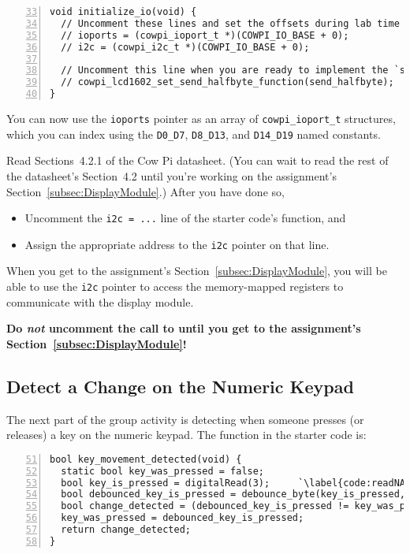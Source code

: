 \begin{lstlisting}[numberstyle=\color{gray}, numbers=left, firstnumber=33]
void initialize_io(void) {
  // Uncomment these lines and set the offsets during lab time
  // ioports = (cowpi_ioport_t *)(COWPI_IO_BASE + 0);
  // i2c = (cowpi_i2c_t *)(COWPI_IO_BASE + 0);

  // Uncomment this line when you are ready to implement the `send_halfbyte()` function
  // cowpi_lcd1602_set_send_halfbyte_function(send_halfbyte);
}
\end{lstlisting}

You can now use the \lstinline{ioports} pointer as an array of \lstinline{cowpi_ioport_t} structures, which you can index using the \lstinline{D0_D7}, \lstinline{D8_D13}, and \lstinline{D14_D19} named constants.

Read Sections~4.2.1 of the Cow Pi datasheet.
(You can wait to read the rest of the datasheet's Section~4.2 until you're working on the assignment's Section~\ref{subsec:DisplayModule}.)
After you have done so,
\begin{itemize}
    \item Uncomment the \lstinline{i2c = ...} line of the starter code's  function, and
    \item Assign the appropriate address to the \lstinline{i2c} pointer on that line.
\end{itemize}

When you get to the assignment's Section~\ref{subsec:DisplayModule}, you will be able to use the \lstinline{i2c} pointer to access the memory-mapped registers to communicate with the display module.

\textbf{Do \textit{not} uncomment the call to  until you get to the assignment's Section~\ref{subsec:DisplayModule}!}


\subsection{Detect a Change on the Numeric Keypad} \label{subsec:detectKeyAction}

The next part of the group activity is detecting when someone presses (or releases) a key on the numeric keypad.
The  function in the starter code is:

\begin{lstlisting}[numberstyle=\color{gray}, numbers=left, firstnumber=51, escapechar=`]
bool key_movement_detected(void) {
  static bool key_was_pressed = false;
  bool key_is_pressed = digitalRead(3);     `\label{code:readNAND}`
  bool debounced_key_is_pressed = debounce_byte(key_is_pressed, KEYPAD);
  bool change_detected = (debounced_key_is_pressed != key_was_pressed);
  key_was_pressed = debounced_key_is_pressed;
  return change_detected;
}
\end{lstlisting}

